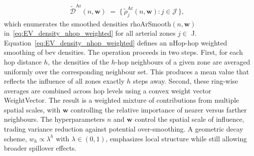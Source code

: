 \begin{align}
  \label{eq:EV_density_set}
  \widetilde{\mathcal{D}}^{\mathrm{Ar}}(n,\mathbf{w})
   \;=\;
   \bigl\{\, 
      \tilde{\rho}^{\mathrm{Ar}}_{j}(n,\mathbf{w}) 
      : j \in \mathcal{J} 
   \,\bigr\},
\end{align}
which enumerates the smoothed densities \gls{rhoArSmooth}$(n,\mathbf{w})$ 
in~\eqref{eq:EV_density_nhop_weighted} for all arterial zones 
$j \in $ \gls{J}.
Equation~\eqref{eq:EV_density_nhop_weighted} defines an \gls{nHop}-hop weighted smoothing of \gls{bev} densities. The operation proceeds in two steps. First, for each hop distance $h$, the densities of the $h$-hop neighbours of a given zone are averaged uniformly over the corresponding neighbour set. This produces a mean value that reflects the influence of all zones exactly $h$ steps away. Second, these ring-wise averages are combined across hop levels using a convex weight vector \gls{WeightVector}. The result is a weighted mixture of contributions from multiple spatial scales, with $\mathbf{w}$ controlling the relative importance of nearer versus farther neighbours.
The hyperparameters $n$ and $\mathbf{w}$ control the spatial scale of influence, trading variance reduction against potential over-smoothing. A geometric decay scheme, $w_h \propto \lambda^h$ with $\lambda \in (0,1)$, emphasizes local structure while still allowing broader spillover effects.



